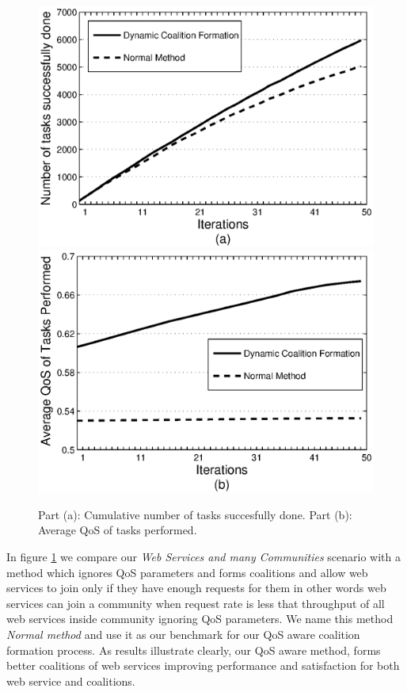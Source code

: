 \documentclass[10pt, conference, compsocconf]{IEEEtran}
\theoremstyle{plain}
\theoremstyle{definition}
\begin{document}
\begin{figure}[!t]
\centering
\includegraphics[scale=0.61]{s2_task_done.eps}
\includegraphics[scale=0.61]{s2_task_qos.eps}
\caption{Part (a): Cumulative number of tasks succesfully done. Part
(b): Average QoS of tasks performed.} \label{performancemany}
\end{figure}

In figure \ref{performancemany} we compare our \emph{Web Services and many Communities} scenario with a method which ignores QoS parameters and forms coalitions and allow web services to join only if they have enough requests for them in other words web services can join a community when request rate is less that throughput of all web services inside community ignoring QoS parameters. We name this method \emph{Normal method} and use it as our benchmark for our QoS aware coalition formation process. As results illustrate clearly, our QoS aware method, forms better coalitions of web services improving performance and satisfaction for both web service and coalitions. 
\end{document}
